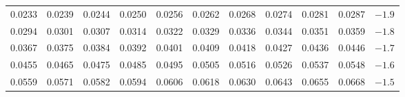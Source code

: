 \begin{frame}
{{\begin{tabular}{| rrrrr | rrrrr | c}
    \hline
  \tiny{0.0233} & \tiny{0.0239} & \tiny{0.0244} & \tiny{0.0250} & \tiny{0.0256} & \tiny{0.0262} & \tiny{0.0268} & \tiny{0.0274} & \tiny{0.0281} & \tiny{0.0287} & $-1.9$ \\
  \tiny{0.0294} & \tiny{0.0301} & \tiny{0.0307} & \tiny{0.0314} & \tiny{0.0322} & \tiny{0.0329} & \tiny{0.0336} & \tiny{0.0344} & \tiny{0.0351} & \tiny{0.0359} & $-1.8$ \\
  \tiny{0.0367} & \tiny{0.0375} & \tiny{0.0384} & \tiny{0.0392} & \tiny{0.0401} & \tiny{0.0409} & \tiny{0.0418} & \tiny{0.0427} & \tiny{0.0436} & \tiny{0.0446} & $-1.7$ \\
  \tiny{0.0455} & \tiny{0.0465} & \tiny{0.0475} & \tiny{0.0485} & \tiny{0.0495} & \tiny{0.0505} & \tiny{0.0516} & \tiny{0.0526} & \tiny{0.0537} & \tiny{0.0548} & $-1.6$ \\
  \tiny{0.0559} & \tiny{0.0571} & \tiny{0.0582} & \tiny{0.0594} & \tiny{0.0606} & \tiny{0.0618} & \tiny{0.0630} & \tiny{0.0643} & \tiny{0.0655} & \tiny{0.0668} & $-1.5$ \\
\hline
\end{tabular}
}}


\end{frame}
